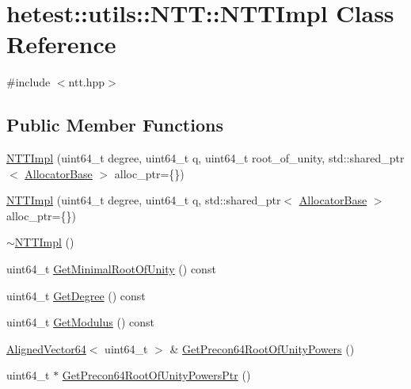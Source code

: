 \hypertarget{classhetest_1_1utils_1_1NTT_1_1NTTImpl}{\section{hetest\-:\-:utils\-:\-:N\-T\-T\-:\-:N\-T\-T\-Impl Class Reference}
\label{classhetest_1_1utils_1_1NTT_1_1NTTImpl}
}


{\ttfamily \#include $<$ntt.\-hpp$>$}

\subsection*{Public Member Functions}
\begin{DoxyCompactItemize}
\item 
\hyperlink{classhetest_1_1utils_1_1NTT_1_1NTTImpl_a44a582a60a18e2231deab0930f172aca}{N\-T\-T\-Impl} (uint64\-\_\-t degree, uint64\-\_\-t q, uint64\-\_\-t root\-\_\-of\-\_\-unity, std\-::shared\-\_\-ptr$<$ \hyperlink{structhetest_1_1utils_1_1AllocatorBase}{Allocator\-Base} $>$ alloc\-\_\-ptr=\{\})
\item 
\hyperlink{classhetest_1_1utils_1_1NTT_1_1NTTImpl_a7b480345b15a13da644d17463a7e7c16}{N\-T\-T\-Impl} (uint64\-\_\-t degree, uint64\-\_\-t q, std\-::shared\-\_\-ptr$<$ \hyperlink{structhetest_1_1utils_1_1AllocatorBase}{Allocator\-Base} $>$ alloc\-\_\-ptr=\{\})
\item 
\hyperlink{classhetest_1_1utils_1_1NTT_1_1NTTImpl_aeb47f4652bcb227cc5313db35a90ec8e}{$\sim$\-N\-T\-T\-Impl} ()
\item 
uint64\-\_\-t \hyperlink{classhetest_1_1utils_1_1NTT_1_1NTTImpl_aab44369dc7690791845a12bc35587157}{Get\-Minimal\-Root\-Of\-Unity} () const 
\item 
uint64\-\_\-t \hyperlink{classhetest_1_1utils_1_1NTT_1_1NTTImpl_a035d8b09e911d41bb5cde863aa5ad128}{Get\-Degree} () const 
\item 
uint64\-\_\-t \hyperlink{classhetest_1_1utils_1_1NTT_1_1NTTImpl_a4d2dac7a361d9afc6cee579d7322bd46}{Get\-Modulus} () const 
\item 
\hyperlink{namespacehetest_1_1utils_ad5b6a78d49dc8f6790f7fd2b10bf3db0}{Aligned\-Vector64}$<$ uint64\-\_\-t $>$ \& \hyperlink{classhetest_1_1utils_1_1NTT_1_1NTTImpl_aac30a427ad979f9b034bb04cbd6d8f27}{Get\-Precon64\-Root\-Of\-Unity\-Powers} ()
\item 
uint64\-\_\-t $\ast$ \hyperlink{classhetest_1_1utils_1_1NTT_1_1NTTImpl_ab534576b83c9c148ca285f304a5a4251}{Get\-Precon64\-Root\-Of\-Unity\-Powers\-Ptr} ()

\end{DoxyCompactItemize}
